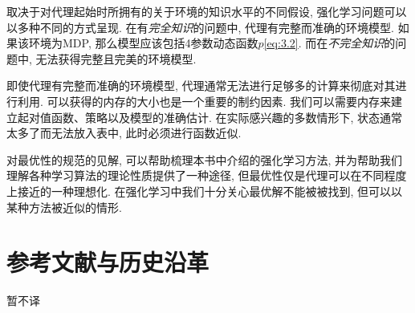 取决于对代理起始时所拥有的关于环境的知识水平的不同假设, 强化学习问题可以以多种不同的方式呈现. 在有\emph{完全知识}的问题中, 代理有完整而准确的环境模型. 如果该环境为MDP, 那么模型应该包括4参数动态函数$p$\eqref{eq:3.2}. 而在\emph{不完全知识}的问题中, 无法获得完整且完美的环境模型.

即使代理有完整而准确的环境模型, 代理通常无法进行足够多的计算来彻底对其进行利用. 可以获得的内存的大小也是一个重要的制约因素. 我们可以需要内存来建立起对值函数、策略以及模型的准确估计. 在实际感兴趣的多数情形下, 状态通常太多了而无法放入表中, 此时必须进行函数近似.

对最优性的规范的见解, 可以帮助梳理本书中介绍的强化学习方法, 并为帮助我们理解各种学习算法的理论性质提供了一种途径, 但最优性仅是代理可以在不同程度上接近的一种理想化. 在强化学习中我们十分关心最优解不能被被找到, 但可以以某种方法被近似的情形. 

\section*{参考文献与历史沿革}

暂不译
